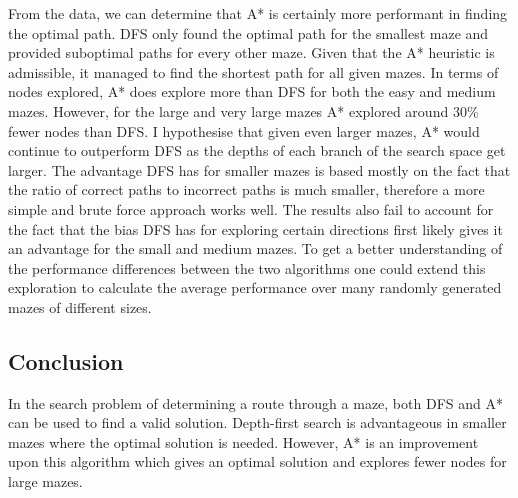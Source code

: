 \documentclass[11pt]{article}
\begin{document}
From the data, we can determine that A* is certainly more performant in
finding the optimal path. DFS only found the optimal path for the
smallest maze and provided suboptimal paths for every other maze. Given
that the A* heuristic is admissible, it managed to find the shortest
path for all given mazes. In terms of nodes explored, A* does explore
more than DFS for both the easy and medium mazes. However, for the large
and very large mazes A* explored around 30\% fewer nodes than DFS. I
hypothesise that given even larger mazes, A* would continue to
outperform DFS as the depths of each branch of the search space get
larger. The advantage DFS has for smaller mazes is based mostly on the
fact that the ratio of correct paths to incorrect paths is much smaller,
therefore a more simple and brute force approach works well. The results
also fail to account for the fact that the bias DFS has for exploring
certain directions first likely gives it an advantage for the small and
medium mazes. To get a better understanding of the performance
differences between the two algorithms one could extend this exploration
to calculate the average performance over many randomly generated mazes
of different sizes.

\subsection{Conclusion}\label{conclusion}

In the search problem of determining a route through a maze, both DFS
and A* can be used to find a valid solution. Depth-first search is
advantageous in smaller mazes where the optimal solution is needed.
However, A* is an improvement upon this algorithm which gives an optimal
solution and explores fewer nodes for large mazes.
\end{document}
